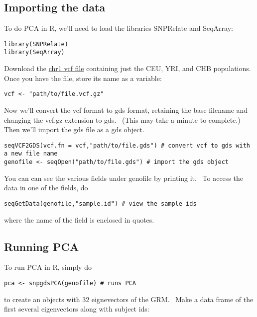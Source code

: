 \documentclass[
]{book}
\begin{document}
\hypertarget{importing-the-data}{%
\subsection{Importing the data}\label{importing-the-data}}

To do PCA in R, we'll need to load the libraries SNPRelate and SeqArray:

\begin{verbatim}
library(SNPRelate)
library(SeqArray)
\end{verbatim}

Download the \href{https://github.com/wletsou/BIOL-350/raw/master/docs/CHB\%2BYRI\%2BCEU.chr1.vcf.gz}{chr1 vcf file} containing just the CEU, YRI, and CHB populations.~ Once you have the file, store its name as a variable:

\begin{verbatim}
vcf <- "path/to/file.vcf.gz"
\end{verbatim}

Now we'll convert the vcf format to gds format, retaining the base filename and changing the vcf.gz extension to gds.~ (This may take a minute to complete.)~ Then we'll import the gds file as a gds object.

\begin{verbatim}
seqVCF2GDS(vcf.fn = vcf,"path/to/file.gds") # convert vcf to gds with a new file name
genofile <- seqOpen("path/to/file.gds") # import the gds object
\end{verbatim}

You can can see the various fields under genofile by printing it.~ To access the data in one of the fields, do

\begin{verbatim}
seqGetData(genofile,"sample.id") # view the sample ids
\end{verbatim}

where the name of the field is enclosed in quotes.

\hypertarget{running-pca}{%
\subsection{Running PCA}\label{running-pca}}

To run PCA in R, simply do

\begin{verbatim}
pca <- snpgdsPCA(genofile) # runs PCA
\end{verbatim}

to create an objects with 32 eignevectors of the GRM.~ Make a data frame of the first several eigenvectors along with subject ids:
\end{document}
